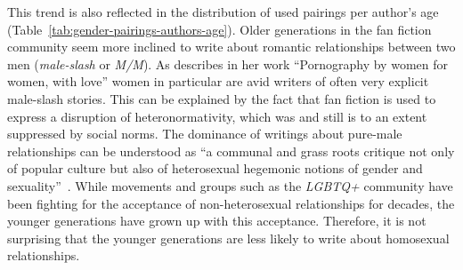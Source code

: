 This trend is also reflected in the distribution of used pairings per author's age (Table~\ref{tab:gender-pairings-authors-age}).
Older generations in the fan fiction community seem more inclined to write about romantic relationships between two men (\emph{male-slash} or \emph{M/M}).
As \citet{Russ1985PornographyLove} describes in her work ``Pornography by women for women, with love'' women in particular are avid writers of often very explicit male-slash stories.
This can be explained by the fact that fan fiction is used to express a disruption of heteronormativity, which was and still is to an extent suppressed by social norms.
The dominance of writings about pure-male relationships can be understood as ``a communal and grass roots critique not only of popular culture but also of heterosexual hegemonic notions of gender and sexuality''~\citep{Jung2002QueeringFiction}.
While movements and groups such as the \emph{LGBTQ+} community have been fighting for the acceptance of non-heterosexual relationships for decades, the younger generations have grown up with this acceptance.
Therefore, it is not surprising that the younger generations are less likely to write about homosexual relationships.

